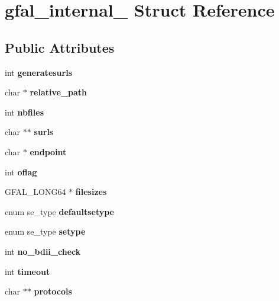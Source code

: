 \section{gfal\_\-internal\_\- Struct Reference}
\label{structgfal__internal__}
\subsection*{Public Attributes}
\begin{DoxyCompactItemize}
\item 
int {\bfseries generatesurls}\label{structgfal__internal___a433d6ad55ebf7c31e089582f36324a20}

\item 
char $\ast$ {\bfseries relative\_\-path}\label{structgfal__internal___a58b6f87472d9e9757703e2b11a4150c3}

\item 
int {\bfseries nbfiles}\label{structgfal__internal___a43faf81a7bfb60192dba856c02abb24d}

\item 
char $\ast$$\ast$ {\bfseries surls}\label{structgfal__internal___adfa2782aaa84efa81313b074a13cf672}

\item 
char $\ast$ {\bfseries endpoint}\label{structgfal__internal___a15724abf73f6a744b99bb6a697dab2e2}

\item 
int {\bfseries oflag}\label{structgfal__internal___ae9c56173b7852a7d1949dfb3775bb5ad}

\item 
GFAL\_\-LONG64 $\ast$ {\bfseries filesizes}\label{structgfal__internal___a4f19e791a50d834677656feb71fa191c}

\item 
enum se\_\-type {\bfseries defaultsetype}\label{structgfal__internal___a57ad77d40cac16111a427b23cabe1dff}

\item 
enum se\_\-type {\bfseries setype}\label{structgfal__internal___a13cef7fce82922e3295c3d7c79bf67dd}

\item 
int {\bfseries no\_\-bdii\_\-check}\label{structgfal__internal___a4f8796b2563f6de43d4de06d472d053f}

\item 
int {\bfseries timeout}\label{structgfal__internal___a4d6f3967f346885a352df3a003cfcc0e}

\item 
char $\ast$$\ast$ {\bfseries protocols}\label{structgfal__internal___a455d676794133c05210f651fc5848a8d}


\end{DoxyCompactItemize}
